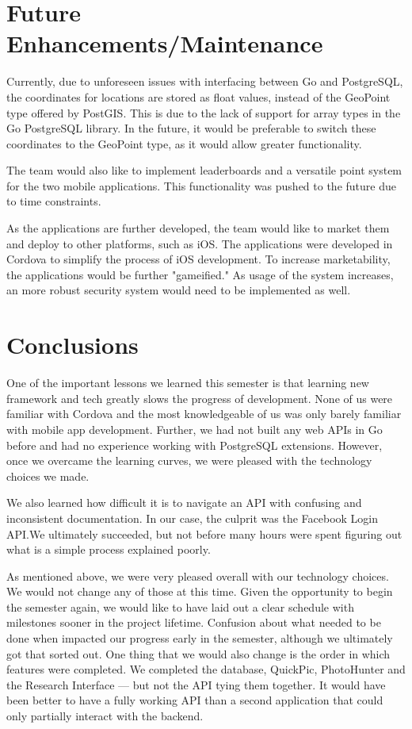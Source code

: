 \documentclass{article}
\begin{document}
\section{Future Enhancements/Maintenance}
Currently, due to unforeseen issues with interfacing between Go and PostgreSQL,
the coordinates for locations are stored as float values, instead of the
GeoPoint type offered by PostGIS. This is due to the lack of support for array
types in the Go PostgreSQL library. In the future, it would be preferable to
switch these coordinates to the GeoPoint type, as it would allow greater
functionality.

The team would also like to implement leaderboards and a versatile point system
for the two mobile applications. This functionality was pushed to the future
due to time constraints. 

As the applications are further developed, the team would like to market them
and deploy to other platforms, such as iOS. The applications were developed in
Cordova to simplify the process of iOS development. To increase marketability,
the applications would be further "gameified." As usage of the system
increases, an more robust security system would need to be implemented as well.

\section{Conclusions}

One of the important lessons we learned this semester is that learning new
framework and tech greatly slows the progress of development. None of us were
familiar with Cordova and the most knowledgeable of us was only barely familiar
with mobile app development. Further, we had not built any web APIs in Go
before and had no experience working with PostgreSQL extensions. However, once
we overcame the learning curves, we were pleased with the technology choices we
made.

We also learned how difficult it is to navigate an API with confusing and
inconsistent documentation. In our case, the culprit was the Facebook Login
API.\@ We ultimately succeeded, but not before many hours were spent figuring out
what is a simple process explained poorly.

As mentioned above, we were very pleased overall with our technology
choices. We would not change any of those at this time. Given the opportunity
to begin the semester again, we would like to have laid out a clear schedule
with milestones sooner in the project lifetime. Confusion about what needed to
be done when impacted our progress early in the semester, although we
ultimately got that sorted out. One thing that we would also change is the
order in which features were completed. We completed the database, QuickPic,
PhotoHunter and the Research Interface --- but not the API tying them
together. It would have been better to have a fully working API than a second
application that could only partially interact with the backend.
\end{document}
